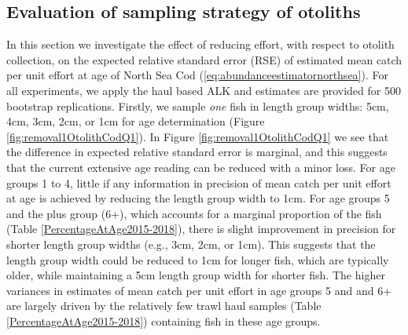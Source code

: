 \documentclass[a4paper 12pt]{article}
\numberwithin{equation}{section}
\begin{document}
\subsection{Evaluation of sampling strategy of otoliths}
\label{sec:optimumeffortresultsOtoliths}
In this section we investigate the effect of reducing effort, with respect to otolith collection, on the expected relative standard error (RSE) of estimated mean catch per unit effort at age of North Sea Cod (\ref{eq:abundanceestimatornorthsea}). For all experiments, we apply the haul based ALK and estimates are provided for 500 bootstrap replications. Firstly, we sample \textit{one} fish in length group widths: 5cm, 4cm, 3cm, 2cm, or 1cm for age determination (Figure \ref{fig:removal1OtolithCodQ1}).  In Figure \ref{fig:removal1OtolithCodQ1} we see that the difference in expected relative standard error is marginal, and this suggests that the current extensive age reading can be reduced with a minor loss. For age groups 1 to 4, little if any information in precision of mean catch per unit effort at age is achieved by reducing the length group width to 1cm. For age groups 5 and the plus group (6+), which accounts for a marginal proportion of the fish (Table \ref{PercentageAtAge2015-2018}), there is slight improvement in precision for shorter length group widths (e.g., 3cm, 2cm, or 1cm). This suggests that the length group width could be reduced to 1cm for longer fish, which are typically older, while maintaining a 5cm length group width for shorter fish. The higher variances in estimates of mean catch per unit effort in age groups 5 and and 6+ are largely driven by the relatively few trawl haul samples (Table \ref{PercentageAtAge2015-2018}) containing fish in these age groups. \\
\end{document}
